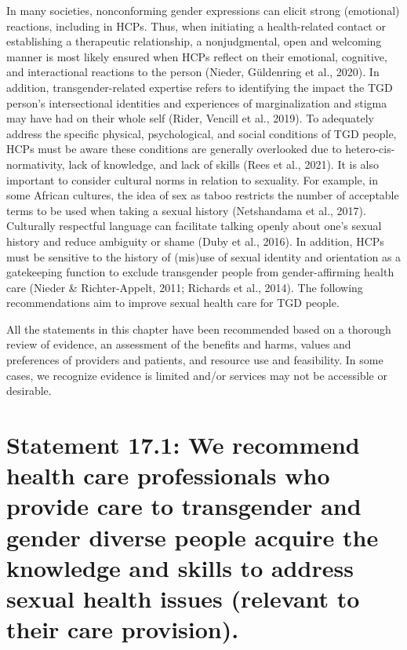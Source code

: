 \documentclass[
]{book}
\begin{document}
In many societies, nonconforming gender
expressions can elicit strong (emotional) reactions, including in HCPs. Thus, when initiating
a health-related contact or establishing a therapeutic relationship, a nonjudgmental, open and
welcoming manner is most likely ensured when
HCPs reflect on their emotional, cognitive, and
interactional reactions to the person (Nieder,
Güldenring et al., 2020). In addition,
transgender-related expertise refers to identifying
the impact the TGD person's intersectional identities and experiences of marginalization and
stigma may have had on their whole self (Rider,
Vencill et al., 2019). To adequately address the
specific physical, psychological, and social conditions of TGD people, HCPs must be aware
these conditions are generally overlooked due to
hetero-cis-normativity, lack of knowledge, and
lack of skills (Rees et al., 2021). It is also important to consider cultural norms in relation to sexuality. For example, in some African cultures, the
idea of sex as taboo restricts the number of
acceptable terms to be used when taking a sexual
history (Netshandama et al., 2017). Culturally
respectful language can facilitate talking openly
about one's sexual history and reduce ambiguity
or shame (Duby et al., 2016). In addition, HCPs
must be sensitive to the history of (mis)use of
sexual identity and orientation as a gatekeeping
function to exclude transgender people from
gender-affirming health care (Nieder \&
Richter-Appelt, 2011; Richards et al., 2014). The
following recommendations aim to improve sexual health care for TGD people.

All the statements in this chapter have been
recommended based on a thorough review of
evidence, an assessment of the benefits and
harms, values and preferences of providers and
patients, and resource use and feasibility. In some
cases, we recognize evidence is limited and/or
services may not be accessible or desirable.

\hypertarget{statement-17.1-we-recommend-health-care-professionals-who-provide-care-to-transgender-and-gender-diverse-people-acquire-the-knowledge-and-skills-to-address-sexual-health-issues-relevant-to-their-care-provision.}{%
\section*{Statement 17.1: We recommend health care professionals who provide care to transgender and gender diverse people acquire the knowledge and skills to address sexual health issues (relevant to their care provision).}\label{statement-17.1-we-recommend-health-care-professionals-who-provide-care-to-transgender-and-gender-diverse-people-acquire-the-knowledge-and-skills-to-address-sexual-health-issues-relevant-to-their-care-provision.}}
\end{document}
